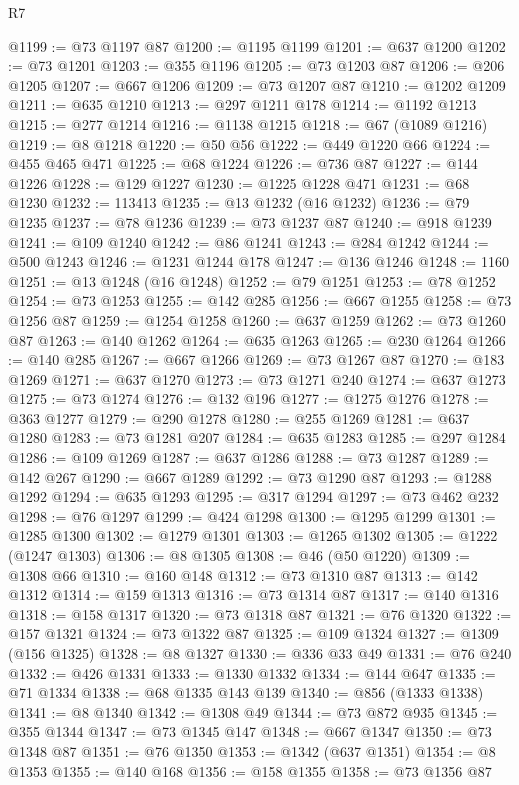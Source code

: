 \begin{lexlean}{R7}
\begin{coremodule}
@1199 := @73 @1197 @87
@1200 := @1195 @1199
@1201 := @637 @1200
@1202 := @73 @1201
@1203 := @355 @1196
@1205 := @73 @1203 @87
@1206 := @206 @1205
@1207 := @667 @1206
@1209 := @73 @1207 @87
@1210 := @1202 @1209
@1211 := @635 @1210
@1213 := @297 @1211 @178
@1214 := @1192 @1213
@1215 := @277 @1214
@1216 := @1138 @1215
@1218 := @67 (@1089 @1216)
@1219 := @8 @1218
@1220 := @50 @56
@1222 := @449 @1220 @66
@1224 := @455 @465 @471
@1225 := @68 @1224
@1226 := @736 @87
@1227 := @144 @1226
@1228 := @129 @1227
@1230 := @1225 @1228 @471
@1231 := @68 @1230
@1232 := 113413
@1235 := @13 @1232 (@16 @1232)
@1236 := @79 @1235
@1237 := @78 @1236
@1239 := @73 @1237 @87
@1240 := @918 @1239
@1241 := @109 @1240
@1242 := @86 @1241
@1243 := @284 @1242
@1244 := @500 @1243
@1246 := @1231 @1244 @178
@1247 := @136 @1246
@1248 := 1160
@1251 := @13 @1248 (@16 @1248)
@1252 := @79 @1251
@1253 := @78 @1252
@1254 := @73 @1253
@1255 := @142 @285
@1256 := @667 @1255
@1258 := @73 @1256 @87
@1259 := @1254 @1258
@1260 := @637 @1259
@1262 := @73 @1260 @87
@1263 := @140 @1262
@1264 := @635 @1263
@1265 := @230 @1264
@1266 := @140 @285
@1267 := @667 @1266
@1269 := @73 @1267 @87
@1270 := @183 @1269
@1271 := @637 @1270
@1273 := @73 @1271 @240
@1274 := @637 @1273
@1275 := @73 @1274
@1276 := @132 @196
@1277 := @1275 @1276
@1278 := @363 @1277
@1279 := @290 @1278
@1280 := @255 @1269
@1281 := @637 @1280
@1283 := @73 @1281 @207
@1284 := @635 @1283
@1285 := @297 @1284
@1286 := @109 @1269
@1287 := @637 @1286
@1288 := @73 @1287
@1289 := @142 @267
@1290 := @667 @1289
@1292 := @73 @1290 @87
@1293 := @1288 @1292
@1294 := @635 @1293
@1295 := @317 @1294
@1297 := @73 @462 @232
@1298 := @76 @1297
@1299 := @424 @1298
@1300 := @1295 @1299
@1301 := @1285 @1300
@1302 := @1279 @1301
@1303 := @1265 @1302
@1305 := @1222 (@1247 @1303)
@1306 := @8 @1305
@1308 := @46 (@50 @1220)
@1309 := @1308 @66
@1310 := @160 @148
@1312 := @73 @1310 @87
@1313 := @142 @1312
@1314 := @159 @1313
@1316 := @73 @1314 @87
@1317 := @140 @1316
@1318 := @158 @1317
@1320 := @73 @1318 @87
@1321 := @76 @1320
@1322 := @157 @1321
@1324 := @73 @1322 @87
@1325 := @109 @1324
@1327 := @1309 (@156 @1325)
@1328 := @8 @1327
@1330 := @336 @33 @49
@1331 := @76 @240
@1332 := @426 @1331
@1333 := @1330 @1332
@1334 := @144 @647
@1335 := @71 @1334
@1338 := @68 @1335 @143 @139
@1340 := @856 (@1333 @1338)
@1341 := @8 @1340
@1342 := @1308 @49
@1344 := @73 @872 @935
@1345 := @355 @1344
@1347 := @73 @1345 @147
@1348 := @667 @1347
@1350 := @73 @1348 @87
@1351 := @76 @1350
@1353 := @1342 (@637 @1351)
@1354 := @8 @1353
@1355 := @140 @168
@1356 := @158 @1355
@1358 := @73 @1356 @87

\end{coremodule}
\end{lexlean}
